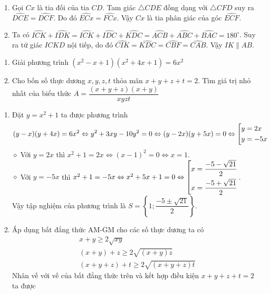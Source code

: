 \begin{ex}
{\begin{enumerate}
\item Gọi $Cx$ là tia đối của tia $CD$. Tam giác $\triangle CDE$ đồng dạng với $\triangle CFD$ suy ra $\widehat{DCE}=\widehat{DCF}$. Do đó $\widehat{ECx}=\widehat{FCx}$. Vậy $Cx$ là tia phân giác của góc $\widehat{ECF}$.
\item Ta có $\widehat{ICK}+\widehat{IDK}=\widehat{ICK}+\widehat{IDC}+\widehat{KDC}=\widehat{ACB}+\widehat{ABC}+\widehat{BAC}=180^\circ$. Suy ra tứ giác $ICKD$ nội tiếp, do đó $\widehat{CIK}=\widehat{KDC}=\widehat{CBF}=\widehat{CAB}$. Vậy $IK\parallel AB$.
\end{enumerate}
}
\end{ex}


\begin{ex}%
\hfill
    \begin{enumerate}
        \item Giải phương trình $\left( x^2-x+1\right)\left( x^2+4x+1\right)=6x^2$
        \item Cho bốn số thực dương $x,y,z,t$ thỏa mãn $x+y+z+t=2$. Tìm giá trị nhỏ nhất của biểu thức $A=\dfrac{(x+y+z)(x+y)}{xyzt}$
    \end{enumerate}
\loigiai
    {
    \begin{enumerate}
        \item Đặt $y=x^2+1$ ta được phương trình 
        	$$(y-x)(y+4x)=6x^2 \Leftrightarrow y^2+3xy-10y^2=0 \Leftrightarrow (y-2x)(y+5x)=0\Leftrightarrow \left[\begin{aligned}&y=2x\\&y=-5x\end{aligned}\right.$$
        	$\diamond$ Với $y=2x$ thì $x^2+1=2x \Leftrightarrow (x-1)^2=0 \Leftrightarrow x=1$.\\
        	$\diamond$ Với $y=-5x$ thì $x^2+1=-5x \Leftrightarrow x^2+5x+1=0 \Leftrightarrow \left[\begin{aligned}&x=\dfrac{-5-\sqrt{21}}{2}\\&x=\dfrac{-5+\sqrt{21}}{2}\end{aligned}\right.$.\\
        Vậy tập nghiệm của phương trình là $S=\left\lbrace 1;\dfrac{-5\pm \sqrt{21}}{2}\right\rbrace.$
        \item Áp dụng bất đẳng thức AM-GM cho các số thực dương ta có
        \begin{align*}
         & x+y \geq 2\sqrt{xy}\\
         & (x+y)+z \geq 2\sqrt{(x+y)z}\\
        & (x+y+z)+t \geq 2\sqrt{(x+y+z)t}
         \end{align*}
         Nhân vế với vế của bất đẳng thức trên và kết hợp điều kiện $x+y+z+t=2$ ta được
       \begin{align*}

\end{align*}
\end{enumerate}}
\end{ex}
